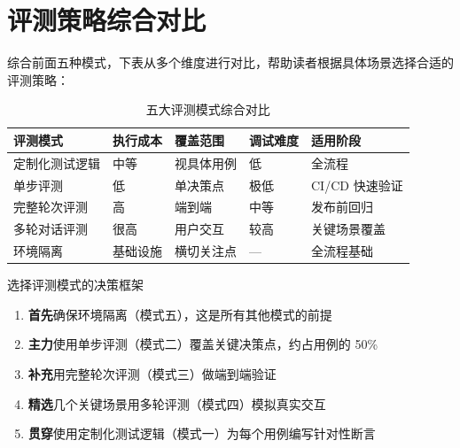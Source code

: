 \section{评测策略综合对比}

综合前面五种模式，下表从多个维度进行对比，帮助读者根据具体场景选择合适的评测策略：

\begin{table}[H]
\centering
\caption{五大评测模式综合对比}
\small
\begin{tabular}{p{2.8cm}p{2cm}p{2cm}p{2cm}p{2.5cm}}
\toprule
\textbf{评测模式} & \textbf{执行成本} & \textbf{覆盖范围} & \textbf{调试难度} & \textbf{适用阶段} \\
\midrule
定制化测试逻辑 & 中等 & 视具体用例 & 低 & 全流程 \\
单步评测 & 低 & 单决策点 & 极低 & CI/CD 快速验证 \\
完整轮次评测 & 高 & 端到端 & 中等 & 发布前回归 \\
多轮对话评测 & 很高 & 用户交互 & 较高 & 关键场景覆盖 \\
环境隔离 & 基础设施 & 横切关注点 & --- & 全流程基础 \\
\bottomrule
\end{tabular}
\end{table}

\begin{importantbox}{选择评测模式的决策框架}
\begin{enumerate}
  \item \textbf{首先}确保环境隔离（模式五），这是所有其他模式的前提
  \item \textbf{主力}使用单步评测（模式二）覆盖关键决策点，约占用例的 50\%
  \item \textbf{补充}用完整轮次评测（模式三）做端到端验证
  \item \textbf{精选}几个关键场景用多轮评测（模式四）模拟真实交互
  \item \textbf{贯穿}使用定制化测试逻辑（模式一）为每个用例编写针对性断言
\end{enumerate}
\end{importantbox}


